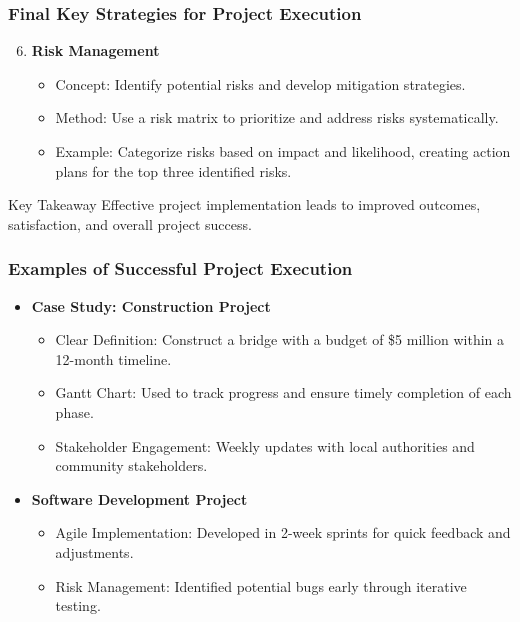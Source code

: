 \documentclass[aspectratio=169]{beamer}
\begin{document}
\begin{frame}[fragile]
  \frametitle{Final Key Strategies for Project Execution}
  \begin{enumerate}
    \setcounter{enumi}{5}
    \item \textbf{Risk Management}
      \begin{itemize}
        \item Concept: Identify potential risks and develop mitigation strategies.
        \item Method: Use a risk matrix to prioritize and address risks systematically.
        \item Example: Categorize risks based on impact and likelihood, creating action plans for the top three identified risks.
      \end{itemize}
  \end{enumerate}

  \begin{block}{Key Takeaway}
    Effective project implementation leads to improved outcomes, satisfaction, and overall project success.
  \end{block}
\end{frame}

\begin{frame}[fragile]
  \frametitle{Examples of Successful Project Execution}
  \begin{itemize}
    \item \textbf{Case Study: Construction Project}
      \begin{itemize}
        \item Clear Definition: Construct a bridge with a budget of \$5 million within a 12-month timeline.
        \item Gantt Chart: Used to track progress and ensure timely completion of each phase.
        \item Stakeholder Engagement: Weekly updates with local authorities and community stakeholders.
      \end{itemize}

    \item \textbf{Software Development Project}
      \begin{itemize}
        \item Agile Implementation: Developed in 2-week sprints for quick feedback and adjustments.
        \item Risk Management: Identified potential bugs early through iterative testing.
      \end{itemize}
  \end{itemize}
\end{frame}
\end{document}
